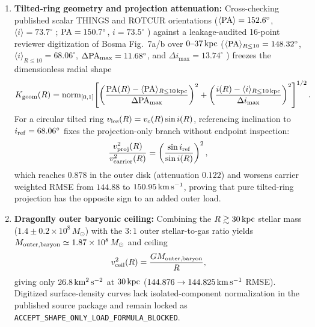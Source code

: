 \documentclass[11pt]{article}
\begin{document}
\begin{enumerate}
  \item \textbf{Tilted-ring geometry and projection attenuation:}
  Cross-checking published scalar THINGS and ROTCUR orientations
  (\(\langle{\rm PA}\rangle=152.6^\circ\), \(\langle i\rangle=73.7^\circ\)
  \cite{deBlok2008THINGS}; \({\rm PA}=150.7^\circ\), \(i=73.5^\circ\)
  \cite{Samurovic2015NGC2841}) against a leakage-audited 16-point reviewer
  digitization of Bosma Fig.~7a/b over \(0\text{--}37\,{\rm kpc}\)
  (\(\langle{\rm PA}\rangle_{R\le 10}=148.32^\circ\),
  \(\langle i\rangle_{R\le 10}=68.06^\circ\),
  \(\Delta{\rm PA}_{\max}=11.68^\circ\), and \(\Delta i_{\max}=13.74^\circ\)
  \cite{Bosma1981NGC2841HI}) freezes the dimensionless radial shape
  \begin{equation}
    K_{\rm geom}(R)=
    \operatorname{norm}_{[0,1]}\!\left[
      \left(\frac{{\rm PA}(R)-\langle{\rm PA}\rangle_{R\le 10\,{\rm kpc}}}{\Delta{\rm PA}_{\max}}\right)^2
      +\left(\frac{i(R)-\langle i\rangle_{R\le 10\,{\rm kpc}}}{\Delta i_{\max}}\right)^2
    \right]^{1/2}.
  \end{equation}
  For a circular tilted ring \(v_{\rm los}(R)=v_c(R)\sin i(R)\), referencing
  inclination to \(i_{\rm ref}=68.06^\circ\) fixes the projection-only branch
  without endpoint inspection:
  \begin{equation}
    \frac{v_{\rm proj}^2(R)}{v_{\rm carrier}^2(R)}
    =\left(\frac{\sin i_{\rm ref}}{\sin i(R)}\right)^2,
  \end{equation}
  which reaches \(0.878\) in the outer disk (attenuation \(0.122\)) and worsens
  carrier weighted RMSE from \(144.88\) to \(150.95\,{\rm km\,s^{-1}}\),
  proving that pure tilted-ring projection has the opposite sign to an added
  outer load.

  \item \textbf{Dragonfly outer baryonic ceiling:}
  Combining the \(R\gtrsim 30\,{\rm kpc}\) stellar mass
  (\(1.4\pm 0.2\times 10^8\,M_\odot\)) with the \(3{:}1\) outer stellar-to-gas
  ratio \cite{Zhang2018NGC2841Dragonfly} yields
  \(M_{\rm outer,baryon}\simeq 1.87\times 10^8\,M_\odot\) and ceiling
  \begin{equation}
    v_{\rm ceil}^2(R)=\frac{G M_{\rm outer,baryon}}{R},
  \end{equation}
  giving only \(26.8\,{\rm km^2\,s^{-2}}\) at \(30\,{\rm kpc}\)
  (\(144.876\to 144.825\,{\rm km\,s^{-1}}\) RMSE).  Digitized surface-density
  curves lack isolated-component normalization in the published source package
  and remain locked as
  \texttt{ACCEPT\_\allowbreak SHAPE\_\allowbreak ONLY\_\allowbreak LOAD\_\allowbreak FORMULA\_\allowbreak BLOCKED}.


\end{enumerate}
\end{document}
